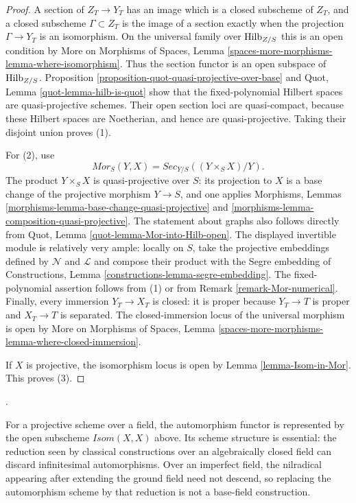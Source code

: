 \begin{proof}
A section of $Z_T \to Y_T$ has an image which is a closed subscheme of
$Z_T$, and a closed subscheme $\Gamma \subset Z_T$ is the image of a
section exactly when the projection $\Gamma \to Y_T$ is an isomorphism.
On the universal family over $\mathrm{Hilb}_{Z/S}$ this is an open condition
by More on Morphisms of Spaces, Lemma
\ref{spaces-more-morphisms-lemma-where-isomorphism}. Thus the section
functor is an open subspace of $\mathrm{Hilb}_{Z/S}$. Proposition
\ref{proposition-quot-quasi-projective-over-base} and Quot, Lemma
\ref{quot-lemma-hilb-is-quot} show that the fixed-polynomial Hilbert spaces
are quasi-projective schemes. Their open section loci are quasi-compact,
because these Hilbert spaces are Noetherian, and hence are quasi-projective.
Taking their disjoint union proves (1).

For (2), use
$$
\mathit{Mor}_S(Y, X) =
\mathit{Sec}_{Y/S}((Y \times_S X)/Y).
$$
The product $Y \times_S X$ is quasi-projective over $S$: its projection to
$X$ is a base change of the projective morphism $Y \to S$, and one applies
Morphisms, Lemmas \ref{morphisms-lemma-base-change-quasi-projective} and
\ref{morphisms-lemma-composition-quasi-projective}. The statement about
graphs also follows directly from Quot, Lemma
\ref{quot-lemma-Mor-into-Hilb-open}. The displayed invertible module is
relatively very ample: locally on $S$, take the projective embeddings
defined by $\mathcal{N}$ and $\mathcal{L}$ and compose their product with
the Segre embedding of Constructions, Lemma
\ref{constructions-lemma-segre-embedding}. The fixed-polynomial assertion
follows from (1) or from Remark \ref{remark-Mor-numerical}. Finally, every
immersion $Y_T \to X_T$ is closed: it is proper because $Y_T \to T$ is
proper and $X_T \to T$ is separated. The closed-immersion locus of the
universal morphism is open by More on Morphisms of Spaces, Lemma
\ref{spaces-more-morphisms-lemma-where-closed-immersion}.

If $X$ is projective, the isomorphism locus is open by Lemma
\ref{lemma-Isom-in-Mor}. This proves (3).
\end{proof}

\begin{remark}
\label{remark-automorphism-scheme-nilpotents}
\begin{reference}
\cite[Expos\'e 221, final paragraph of Section 4(c), p. 268]{FGA}.
\end{reference}
For a projective scheme over a field, the automorphism functor is represented
by the open subscheme $\mathit{Isom}(X, X)$ above. Its scheme structure is
essential: the reduction seen by classical constructions over an
algebraically closed field can discard infinitesimal automorphisms. Over an
imperfect field, the nilradical appearing after extending the ground field
need not descend, so replacing the automorphism scheme by that reduction is
not a base-field construction.
\end{remark}






